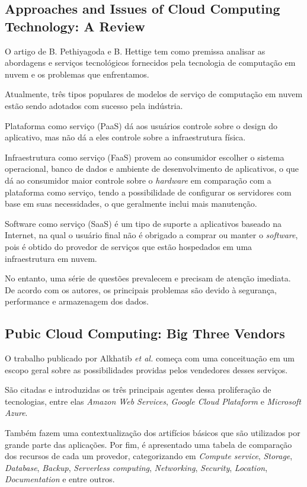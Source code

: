 \documentclass[12pt]{article}
\begin{document}
\subsection{Approaches and Issues of Cloud Computing Technology: A Review \cite{pethi}}

O artigo de B. Pethiyagoda e B. Hettige tem como premissa analisar as abordagens e serviços tecnológicos fornecidos pela tecnologia de computação em nuvem e os problemas que enfrentamos.

Atualmente, três tipos populares de modelos de serviço de computação em nuvem estão sendo adotados com sucesso pela indústria. 

Plataforma como serviço (PaaS) dá aos usuários controle sobre o design do aplicativo, mas não dá a eles controle sobre a infraestrutura física. 

Infraestrutura como serviço (FaaS) provem ao consumidor escolher o sistema operacional, banco de dados e ambiente de desenvolvimento de aplicativos, o que dá ao consumidor maior controle sobre o \emph{hardware} em comparação com a plataforma como serviço, tendo a possibilidade de configurar os servidores com base em suas necessidades, o que geralmente inclui mais manutenção.

Software como serviço (SaaS) é um tipo de suporte a aplicativos baseado na Internet, na qual o usuário final não é obrigado a comprar ou manter o \emph{software}, pois é obtido do provedor de serviços que estão hospedados em uma infraestrutura em nuvem.

No entanto, uma série de questões prevalecem e precisam de atenção imediata. De acordo com os autores, os principais problemas são devido à segurança, performance e armazenagem dos dados.

\subsection{Pubic Cloud Computing: Big Three Vendors \cite{randa}}

O trabalho publicado por Alkhatib \emph{et al.} começa com uma conceituação em um escopo geral sobre as possibilidades providas pelos vendedores desses serviços.

São citadas e introduzidas os três principais agentes dessa proliferação de tecnologias, entre elas \emph{Amazon Web Services}, \emph{Google Cloud Plataform} e \emph{Microsoft Azure}.

Também fazem uma contextualização dos artifícios básicos que são utilizados por grande parte das aplicações. Por fim, é apresentado uma tabela de comparação dos recursos de cada um provedor, categorizando em \emph{Compute service}, \emph{Storage}, \emph{Database}, \emph{Backup}, \emph{Serverless computing}, \emph{Networking}, \emph{Security}, \emph{Location}, \emph{Documentation} e entre outros.
\end{document}
